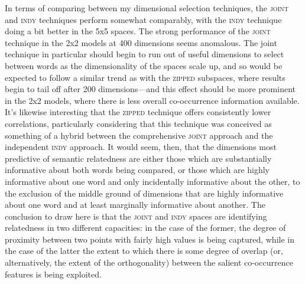 In terms of comparing between my dimensional selection techniques, the \textsc{joint} and \textsc{indy} techniques perform somewhat comparably, with the \textsc{indy} technique doing a bit better in the 5x5 spaces.  The strong performance of the \textsc{joint} technique in the 2x2 models at 400 dimensions seems anomalous.  The joint technique in particular should begin to run out of useful dimensions to select between words as the dimensionality of the spaces scale up, and so would be expected to follow a similar trend as with the \textsc{zipped} subspaces, where results begin to tail off after 200 dimensions---and this effect should be more prominent in the 2x2 models, where there is less overall co-occurrence information available.  It's likewise interesting that the \textsc{zipped} technique offers consistently lower correlations, particularly considering that this technique was conceived as something of a hybrid between the comprehensive \textsc{joint} approach and the independent \textsc{indy} approach.  It would seem, then, that the dimensions most predictive of semantic relatedness are either those which are substantially informative about both words being compared, or those which are highly informative about one word and only incidentally informative about the other, to the exclusion of the middle ground of dimensions that are highly informative about one word and at least marginally informative about another.  The conclusion to draw here is that the \textsc{joint} and \textsc{indy} spaces are identifying relatedness in two different capacities: in the case of the former, the degree of proximity between two points with fairly high values is being captured, while in the case of the latter the extent to which there is some degree of overlap (or, alternatively, the extent of the orthogonality) between the salient co-occurrence features is being exploited.

